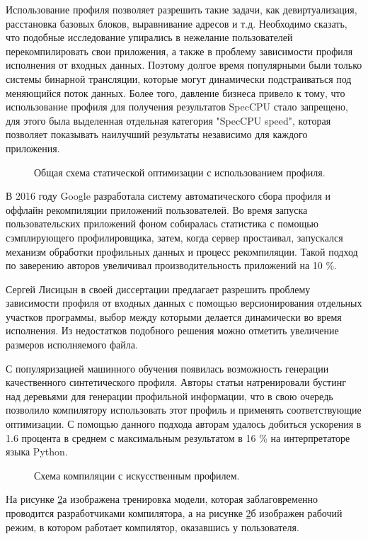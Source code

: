  Использование профиля позволяет разрешить такие задачи, как девиртуализация, расстановка базовых блоков, выравнивание адресов и т.д. Необходимо сказать, что  подобные исследование упирались в нежелание пользователей перекомпилировать свои приложения, а также в проблему зависимости профиля исполнения от входных данных. Поэтому долгое  время популярными были только системы бинарной трансляции, которые могут динамически подстраиваться под меняющийся поток данных. Более того, давление бизнеса привело к тому, что использование профиля для получения результатов SpecCPU стало запрещено, для этого была выделенная отдельная категория "SpecCPU speed", которая позволяет показывать наилучший результаты независимо для каждого приложения.
\begin{figure}[htbp]
	\centering
	
	\caption{Общая схема статической оптимизации с использованием профиля.}
	\label{partReview:fdo1}
\end{figure}

В 2016 году Google разработала систему автоматического сбора профиля и оффлайн рекомпиляции приложений пользователей. Во время запуска пользовательских приложений фоном собиралась статистика с помощью сэмплирующего профилировщика, затем, когда сервер простаивал, запускался механизм обработки профильных данных и процесс рекомпиляции. Такой подход по заверению авторов увеличивал производительность приложений на 10 \%.  


Сергей Лисицын  в своей диссертации предлагает разрешить проблему зависимости профиля от входных данных с помощью версионирования отдельных участков программы, выбор между которыми делается динамически во время исполнения. Из недостатков подобного решения можно отметить увеличение размеров исполняемого файла.

С популяризацией машинного обучения появилась возможность генерации качественного синтетического профиля. Авторы статьи натренировали бустинг над деревьями для генерации профильной информации, что в свою очередь позволило компилятору использовать этот профиль и применять соответствующие оптимизации. С помощью данного подхода авторам удалось добиться ускорения в 1.6 процента в среднем с максимальным результатом в 16 \%  на интерпретаторе языка Python. 
\begin{figure}[htbp]
	\centering
	
	\caption{Схема компиляции с искусственным профилем.}
	\label{partReview:pgo_without profile}
\end{figure}
На рисунке \ref{partReview:pgo_without profile}а изображена тренировка модели, которая заблаговременно проводится разработчиками компилятора, а на рисунке \ref{partReview:pgo_without profile}б изображен рабочий режим, в котором работает компилятор, оказавшись у пользователя.




